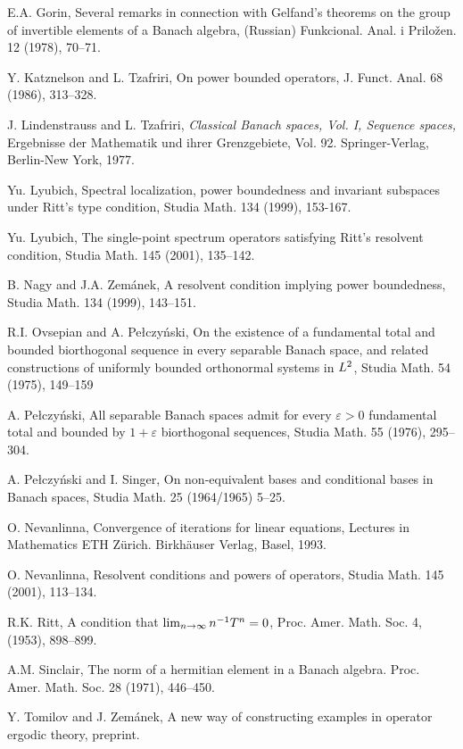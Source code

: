 \documentclass[12pt]{amsart}
\begin{document}
\begin{thebibliography}{999}

 E.A. Gorin,  Several remarks in connection with Gelfand's 
theorems on the group
   of invertible elements of a Banach algebra, (Russian) 
Funkcional. Anal. i Prilo\v zen. 12 (1978),
   70--71.

Y. Katznelson and L. Tzafriri,
On power bounded operators,
J. Funct. Anal. 68 (1986), 313--328.

J. Lindenstrauss and L. Tzafriri, {\it Classical Banach spaces,
Vol. I, Sequence spaces,} Ergebnisse der Mathematik und ihrer
Grenzgebiete, Vol. 92. Springer-Verlag, Berlin-New York, 1977.

Yu. Lyubich,
Spectral localization, power boundedness and invariant subspaces
under Ritt's type condition, Studia Math. 134 (1999), 153-167.

Yu. Lyubich,  The single-point spectrum operators satisfying
Ritt's resolvent condition, Studia Math.  145  (2001), 135--142.

B. Nagy and J.A. Zem\'anek, A resolvent condition
implying power boundedness,  Studia Math.  134  (1999), 143--151.

  R.I. Ovsepian and A. Pe\l czy\'nski, On the existence of a fundamental total and
   bounded biorthogonal sequence in every separable Banach space, and related constructions of uniformly
   bounded orthonormal systems in $L\sp{2}$, Studia Math. 54 (1975),  149--159

 A. Pe\l czy\'nski, All separable Banach spaces admit for every
$\varepsilon >0$
   fundamental total and bounded by $1+\varepsilon $ biorthogonal sequences, 
Studia Math. 55 (1976),
    295--304.

 A. Pe\l czy\'nski and I. Singer,  On non-equivalent bases and
conditional bases in Banach
   spaces, Studia Math. 25 (1964/1965) 5--25.

O. Nevanlinna, Convergence of iterations for linear equations,
Lectures in Mathematics ETH Z\"urich. Birkh\"auser Verlag, Basel, 1993.

O. Nevanlinna, Resolvent conditions and powers of operators,
Studia Math.  145  (2001), 113--134.

R.K. Ritt,  A condition that $\lim\sb {n\to\infty}n\sp {-1}T\sp
n=0$, Proc. Amer. Math. Soc.  4,  (1953), 898--899.

A.M. Sinclair,  The norm of a hermitian element in a Banach
algebra. Proc. Amer. Math. Soc.  28  (1971), 446--450.

Y. Tomilov and J. Zem\'anek, A new way of constructing
examples in operator ergodic theory,  preprint.

\end{thebibliography}
\end{document}
